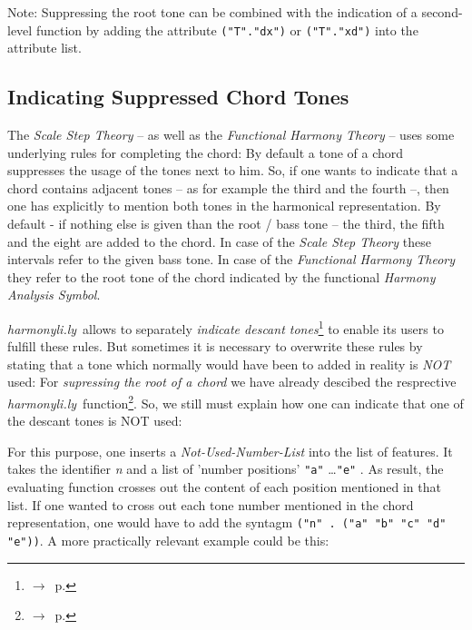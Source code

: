 \documentclass[
  DIV=calc,
  BCOR=5mm,
  12pt,
  headings=small,
  oneside,
  abstract=true,
  toc=bib,
  xcolor=dvipsnames,
  openany,
  english]{scrartcl}
\newcommand{\acc}[0]{\textit}
\newcommand{\ra}[0]{$\rightarrow$}
\newcommand{\hlyn}[0]{\textit{harmonyli.ly}}
\newcommand{\has}[1]{\textit{Harmony Analysis Symbol#1}}
\begin{document}
Note: Suppressing the root tone can be combined with the indication of a
second-level function by adding the attribute \texttt{("T"."dx")} or
\texttt{("T"."xd")} into the attribute list.

\subsection{Indicating Suppressed Chord Tones}

The \acc{Scale Step Theory} -- as well as the \acc{Functional Harmony Theory} --
uses some underlying rules for completing the chord: By default a tone of a
chord suppresses the usage of the tones next to him. So, if one wants to
indicate that a chord contains adjacent tones -- as for example the third and
the fourth --, then one has explicitly to mention both tones in the harmonical
representation. By default - if nothing else is given than the root / bass tone
-- the third, the fifth and the eight are added to the chord. In case of the
\acc{Scale Step Theory} these intervals refer to the given bass tone. In case of
the \acc{Functional Harmony Theory} they refer to the root tone of the chord
indicated by the functional \has{}.

\hlyn\ allows to separately
\acc{indicate descant tones}\footnote{\ra\ p.\pageref{IndicateDescantTones}}
to enable its users to fulfill these rules. But sometimes it is necessary to
overwrite these rules by stating that a tone which normally would have been to
added in reality is \acc{NOT} used: For \acc{supressing the root of a chord} we
have already descibed the resprective \hlyn\ function\footnote{\ra\
p.\pageref{SupressRootTone}}. So, we still must explain how one can indicate
that one of the descant tones is {NOT} used:

For this purpose, one inserts a \acc{Not-Used-Number-List} into the list of
features. It takes the identifier \acc{n} and a list of 'number positions'
\verb|"a"| \ldots \verb|"e"| . As result, the evaluating function crosses out
the content of each position mentioned in that list. If one wanted to cross out
each tone number mentioned in the chord representation, one would have to add
the syntagm \verb|("n" . ("a" "b" "c" "d" "e"))|. A more practically relevant
example could be this:

\begin{center}
\end{center}
\end{document}
